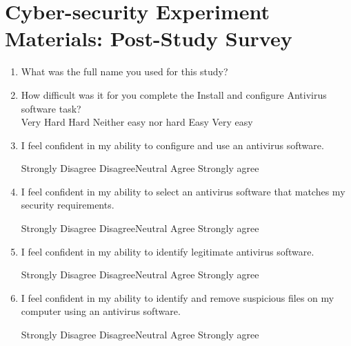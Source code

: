 \chapter{Cyber-security Experiment Materials: Post-Study Survey}
\label{apx:cypost}
\begin{enumerate}[noitemsep]
\item What was the full name you used for this study?
\item How difficult was it for you complete the Install and configure Antivirus software task?\\
Very Hard \hspace{1cm} Hard \hspace{1cm} Neither easy nor hard \hspace{1cm} Easy \hspace{1cm} Very easy 
\item I feel confident in my ability to configure and use an antivirus software.
\par Strongly Disagree \hspace{1cm} Disagree\hspace{1cm}Neutral\hspace{1cm} Agree\hspace{1cm} Strongly agree
\item I feel confident in my ability to select an antivirus software that matches my security requirements.
\par Strongly Disagree \hspace{1cm} Disagree\hspace{1cm}Neutral\hspace{1cm} Agree\hspace{1cm} Strongly agree
\item I feel confident in my ability to identify legitimate antivirus software.
\par Strongly Disagree \hspace{1cm} Disagree\hspace{1cm}Neutral\hspace{1cm} Agree\hspace{1cm} Strongly agree
\item I feel confident in my ability to identify and remove suspicious files on my computer using an antivirus software.
\par Strongly Disagree \hspace{1cm} Disagree\hspace{1cm}Neutral\hspace{1cm} Agree\hspace{1cm} Strongly agree

\end{enumerate}
